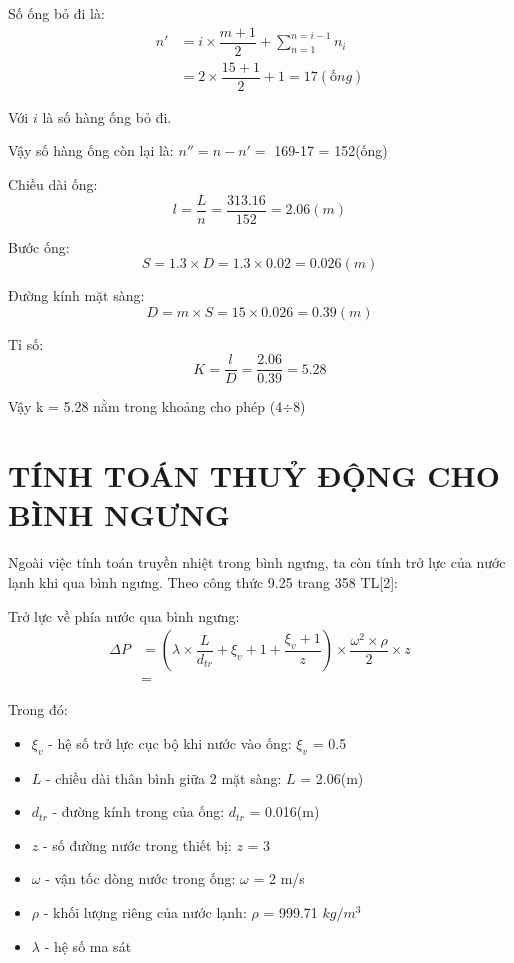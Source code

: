 Số ống bỏ đi là:
\begin{equation*}
	\begin{split}
		n' &= i\times \dfrac{m + 1}{2} + \sum_{n=1}^{n=i-1}n_{i}\\
		&=  2 \times \dfrac{15+1}{2}+1 = 17(ống)
	\end{split}
\end{equation*}

Với $i$ là số hàng ống bỏ đi.

Vậy số hàng ống còn lại là: $n'' = n - n' = $ 169-17 = 152(ống)

Chiều dài ống:
\begin{equation*}
	l = \dfrac{L}{n} = \dfrac{313.16}{152}= 2.06(m)
\end{equation*}

Bước ống:
\begin{equation*}
	S = 1.3\times D = 1.3 \times 0.02 = 0.026(m)
\end{equation*}

Đường kính mặt sàng:
\begin{equation*}
	D = m\times S = 15 \times 0.026 = 0.39(m)
\end{equation*}

Tỉ số:
\begin{equation*}
	K = \dfrac{l}{D} =\dfrac{2.06}{0.39}=5.28
\end{equation*}

Vậy k = 5.28 nằm trong khoảng cho phép (4$\div$8)

\section{TÍNH TOÁN THUỶ ĐỘNG CHO BÌNH NGƯNG}
Ngoài việc tính toán truyền nhiệt trong bình ngưng, ta còn tính trở lực của nước lạnh khi qua bình ngưng. Theo công thức 9.25 trang 358 TL[2]:

Trở lực về phía nước qua bình ngưng:
\begin{equation*}
	\begin{split}
		\Delta P &= \left(\lambda\times\dfrac{L}{d_{tr}} +\xi_{v} + 1 + \dfrac{\xi_{v} + 1}{z}\right)\times \dfrac{\omega^2\times\rho}{2}\times z\\
		&=  
	\end{split}
\end{equation*}

Trong đó:
\begin{itemize}
	\item $\xi_{v}$ - hệ số trở lực cục bộ khi nước vào ống: $\xi_{v}$ = 0.5
	\item $L$ - chiều dài thân bình giữa 2 mặt sàng: $L$ = 2.06(m)
	\item $d_{tr}$ - đường kính trong của ống: $d_{tr}$ = 0.016(m)
	\item $z$ - số đường nước trong thiết bị: $z$ = 3
	\item $\omega$ - vận tốc dòng nước trong ống: $\omega$ = 2 m/s
	\item $\rho$ - khối lượng riêng của nước lạnh: $\rho$ = 999.71 $kg/m^3$
	\item $\lambda$ - hệ số ma sát	
\end{itemize}

